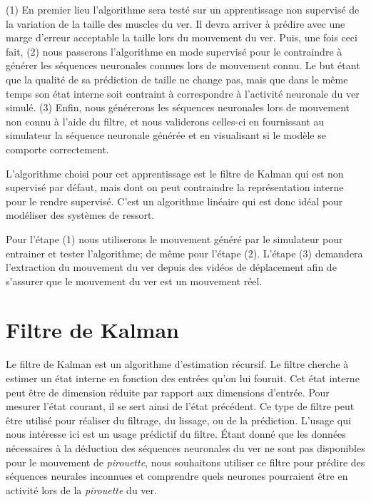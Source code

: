(1) En premier lieu l'algorithme sera testé sur un apprentissage non supervisé
de la variation de la taille des muscles du ver.  Il devra arriver à prédire
avec une marge d'erreur acceptable la taille lors du mouvement du ver. Puis,
une fois ceci fait, (2) nous passerons l'algorithme en mode supervisé pour le
contraindre à générer les séquences neuronales connues lors de mouvement connu.
Le but étant que la qualité de sa prédiction de taille ne change pas, mais que
dans le même temps son état interne soit contraint à correspondre à l'activité
neuronale du ver simulé. (3) Enfin, nous générerons les séquences neuronales lors de
mouvement non connu à l'aide du filtre, et nous validerons celles-ci en fournissant
au simulateur la séquence neuronale générée et en visualisant si le modèle se
comporte correctement.

L'algorithme choisi pour cet apprentissage est le filtre de Kalman qui est non
supervisé par défaut, mais dont on peut contraindre la représentation interne
pour le rendre supervisé. C'est un algorithme linéaire qui est donc idéal pour
modéliser des systèmes de ressort.

Pour l'étape (1) nous utiliserons le mouvement généré par le simulateur pour
entrainer et tester l'algorithme; de même pour l'étape (2). L'étape (3)
demandera l'extraction du mouvement du ver depuis des vidéos de déplacement 
afin de s'assurer que le mouvement du ver est un mouvement réel.


\section{Filtre de Kalman} %
\label{sec:Filtre de Kalman}

Le filtre de Kalman est un algorithme d'estimation récursif. Le filtre cherche
à estimer un état interne en fonction des entrées qu'on lui fournit. Cet état
interne peut être de dimension réduite par rapport aux dimensions d'entrée.
Pour mesurer l'état courant, il se sert ainsi de l'état précédent. Ce type de
filtre peut être utilisé pour réaliser du filtrage, du lissage, ou de la
prédiction.  L'usage qui nous intéresse ici est un usage prédictif du filtre.
Étant donné que les données nécessaires à la déduction des séquences neuronales
du ver ne sont pas disponibles pour le mouvement de \textit{pirouette}, nous
souhaitons utiliser ce filtre pour prédire des séquences neurales
inconnues et comprendre quels neurones pourraient être en activité lors de la
\textit{pirouette} du ver.

